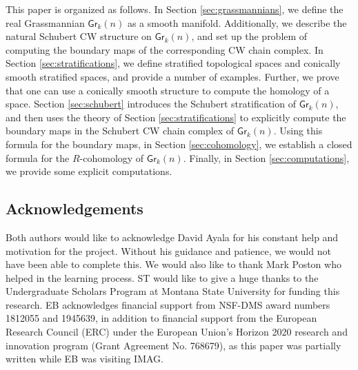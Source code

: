 \documentclass{article}
\newcommand{\msf}[1]{\mathsf{#1}}
\newcommand{\gr}{\msf{Gr}}
\theoremstyle{definition}
\begin{document}
This paper is organized as follows. 
In Section \ref{sec:grassmannians}, we define the real Grassmannian $\gr_k(n)$ as a smooth manifold. Additionally,
we describe the natural Schubert CW structure on $\gr_k(n)$, and set up the problem of computing the boundary
maps of the corresponding CW chain complex. In Section \ref{sec:stratifications}, we define
stratified topological spaces and conically smooth stratified spaces, and provide a number of examples. 
Further, we prove that one can use a conically smooth structure to compute the homology of a space. 
Section \ref{sec:schubert} introduces the Schubert stratification of $\gr_k(n)$, and then uses the theory of
Section \ref{sec:stratifications} to explicitly compute the boundary maps in the Schubert CW chain complex of
$\gr_k(n)$. Using this formula for the boundary maps, in Section \ref{sec:cohomology}, we establish a
closed formula for the $R$-cohomology of $\gr_k(n)$. Finally, in Section \ref{sec:computations}, we provide
some explicit computations.


\subsection{Acknowledgements}
Both authors would like to acknowledge David Ayala for his constant help and motivation for the project. Without his guidance and patience, we would not have been able to complete this. We would also like to thank Mark Poston who helped in the learning process. ST would like to give a huge thanks to the Undergraduate Scholars Program at Montana State University for funding this research. 
EB acknowledges financial support from NSF-DMS award numbers 1812055 and 1945639, in addition to financial support from the European Research Council (ERC) under the European Union's Horizon 2020 research and innovation program (Grant Agreement No. 768679), as this paper was partially written while EB was visiting IMAG.

\end{document}
